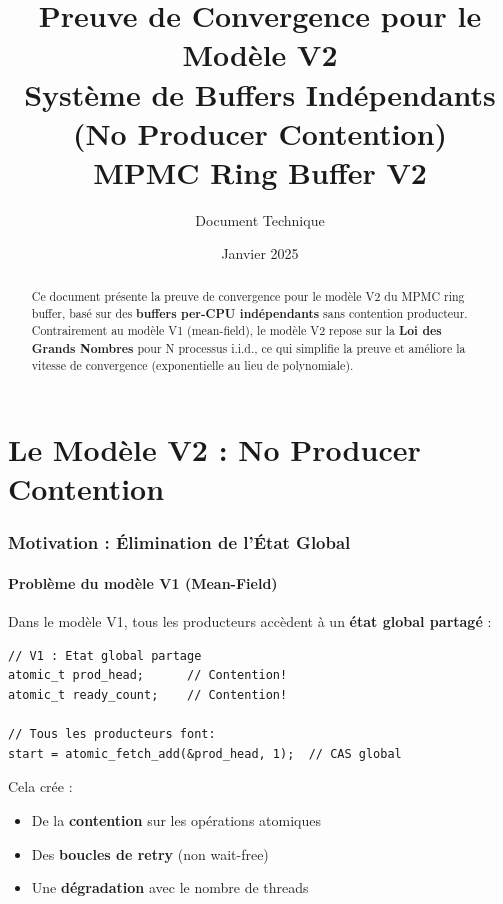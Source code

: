 \documentclass[11pt,a4paper]{article}
\title{\textbf{Preuve de Convergence pour le Modèle V2} \\[0.5em]
\Large Système de Buffers Indépendants (No Producer Contention) \\
MPMC Ring Buffer V2}
\author{Document Technique}
\date{Janvier 2025}
\theoremstyle{plain}
\theoremstyle{definition}
\theoremstyle{remark}
\begin{document}
\maketitle

\begin{abstract}
Ce document présente la preuve de convergence pour le modèle V2 du MPMC ring buffer, basé sur des \textbf{buffers per-CPU indépendants} sans contention producteur. Contrairement au modèle V1 (mean-field), le modèle V2 repose sur la \textbf{Loi des Grands Nombres} pour N processus i.i.d., ce qui simplifie la preuve et améliore la vitesse de convergence (exponentielle au lieu de polynomiale).
\end{abstract}

\tableofcontents
\newpage

\part{Le Modèle V2 : No Producer Contention}

\section{Motivation : Élimination de l'État Global}

\subsection{Problème du modèle V1 (Mean-Field)}

Dans le modèle V1, tous les producteurs accèdent à un \textbf{état global partagé} :

\begin{lstlisting}
// V1 : Etat global partage
atomic_t prod_head;      // Contention!
atomic_t ready_count;    // Contention!

// Tous les producteurs font:
start = atomic_fetch_add(&prod_head, 1);  // CAS global
\end{lstlisting}

Cela crée :
\begin{itemize}
    \item De la \textbf{contention} sur les opérations atomiques
    \item Des \textbf{boucles de retry} (non wait-free)
    \item Une \textbf{dégradation} avec le nombre de threads
\end{itemize}
\end{document}
